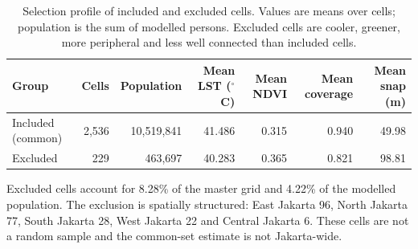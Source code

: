 \begin{table}[htbp]
\centering
\small
\caption{Selection profile of included and excluded cells. Values are means over
cells; population is the sum of modelled persons. Excluded cells are cooler,
greener, more peripheral and less well connected than included cells.}
\label{tab:selection}
\begin{threeparttable}
\begin{tabular}{@{}lrrrrrr@{}}
\toprule
Group & Cells & Population & Mean LST ($^\circ$C) & Mean NDVI & Mean coverage & Mean snap (m) \\
\midrule
Included (common) & 2,536 & 10,519,841 & 41.486 & 0.315 & 0.940 & 49.98 \\
Excluded & 229 & 463,697 & 40.283 & 0.365 & 0.821 & 98.81 \\
\bottomrule
\end{tabular}
\begin{tablenotes}[flushleft]\footnotesize
\item Excluded cells account for 8.28\% of the master grid and 4.22\% of the modelled population. The exclusion is spatially structured: East Jakarta 96, North Jakarta 77, South Jakarta 28, West Jakarta 22 and Central Jakarta 6. These cells are not a random sample and the common-set estimate is not Jakarta-wide.
\end{tablenotes}
\end{threeparttable}
\end{table}
